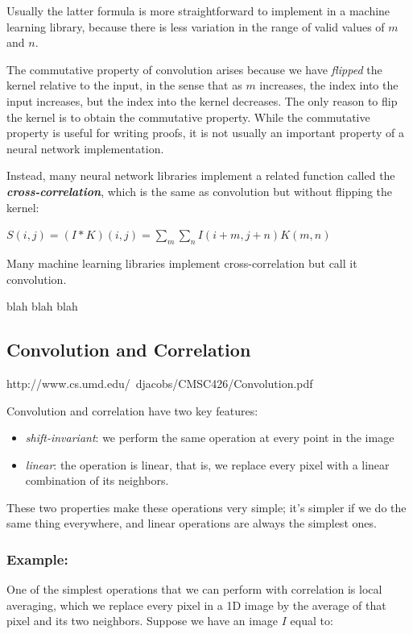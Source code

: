 \documentclass{report}
\begin{document}
Usually the latter formula is more straightforward to implement in a machine learning library, because there is less variation in the range of valid values of $m$ and $n$.\newline

The commutative property of convolution arises because we have \textit{flipped} the kernel relative to the input, in the sense that as $m$ increases, the index into the input increases, but the index into the kernel decreases. The only reason to flip the kernel is to obtain the commutative property. While the commutative property is useful for writing proofs, it is not usually an important property of a neural network implementation.\newline

\noindent Instead, many neural network libraries implement a related function called the \textbf{\textit{cross-correlation}}, which is the same as convolution but without flipping the kernel:\newline\newline
    \centerline{$S(i,j)=(I*K)(i,j)=\sum_m \sum_n I(i+m,j+n)K(m,n)$}\newline\newline
    
Many machine learning libraries implement cross-correlation but call it convolution. 

blah blah blah

\subsection{Convolution and Correlation}
http://www.cs.umd.edu/~djacobs/CMSC426/Convolution.pdf

Convolution and correlation have two key features:
\begin{itemize}
	\item \textit{shift-invariant}: we perform the same operation at every point in the image
    \item \textit{linear}: the operation is linear, that is, we replace every pixel with a linear combination of its neighbors.
\end{itemize}

These two properties make these operations very simple; it's simpler if we do the same thing everywhere, and linear operations are always the simplest ones.

\subsubsection{Example:}
One of the simplest operations that we can perform with correlation is local averaging, which we replace every pixel in a 1D image by the average of that pixel and its two neighbors. Suppose we have an image $I$ equal to:
\end{document}
